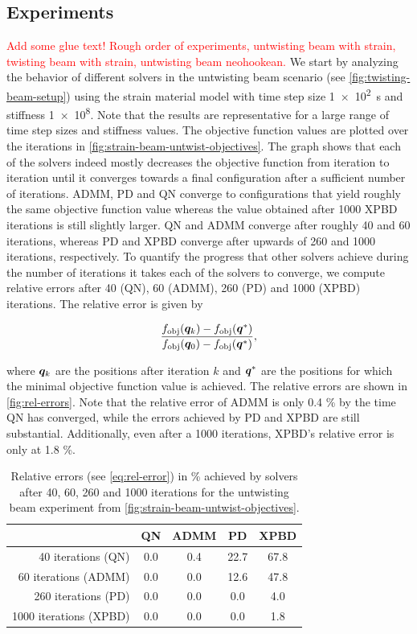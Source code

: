 \subsection{Experiments}\label{ss:experiments}
\textcolor{red}{Add some glue text! Rough order of experiments, untwisting beam with strain, twisting beam with strain, untwisting beam neohookean.}
We start by analyzing the behavior of different solvers in the untwisting beam scenario (see \cref{fig:twisting-beam-setup}) using the strain material model 
with time step size \SI{1e2}{\second} and stiffness \num{1e8}. Note that the results are representative for a large range of time step sizes and stiffness values.
The objective function values are plotted over the iterations in \autoref{fig:strain-beam-untwist-objectives}. The graph shows that each of the solvers indeed mostly 
decreases the objective function from iteration to iteration until it converges towards a final configuration after 
a sufficient number of iterations. ADMM, PD and QN converge to configurations that yield roughly the same objective function value whereas the value obtained after 1000 
XPBD iterations is still slightly larger. QN and ADMM converge after roughly 40 and 60 iterations, whereas PD and XPBD converge after upwards of 260 and 1000 iterations, 
respectively. To quantify the progress that other solvers achieve during the number of iterations it takes each of the solvers to converge, we compute relative errors after 
40 (QN), 60 (ADMM), 260 (PD) and 1000 (XPBD) iterations. The relative error is given by 

\begin{equation}\label{eq:rel-error}
    \frac{f_{\text{obj}}(\bm{q}_k) - f_{\text{obj}}(\bm{q}^*)}{f_{\text{obj}}(\bm{q}_0) - f_{\text{obj}}(\bm{q}^*)},
\end{equation}

\noindent where $\bm{q}_k$ are the positions after iteration $k$ and $\bm{q}^*$ are the positions for which the minimal objective function value is achieved.
The relative errors are shown in \autoref{fig:rel-errors}. Note that the relative error of ADMM is only 0.4 \% by the time QN has converged, while the errors 
achieved by PD and XPBD are still substantial. Additionally, even after a 1000 iterations, XPBD's relative error is only at 1.8 \%.

\begin{table}[h]
\centering
\begin{tabular}{ |r||c|c|c|c| } 
 \hline
 & QN & ADMM & PD & XPBD\\
 \hline
 \hline
    40 iterations (QN) & 0.0 & 0.4 & 22.7 & 67.8 \\ 
    60 iterations (ADMM) & 0.0 & 0.0 & 12.6 & 47.8 \\
    260 iterations (PD) & 0.0 & 0.0 & 0.0 & 4.0 \\
    1000 iterations (XPBD) & 0.0 & 0.0 & 0.0 & 1.8 \\ 
 \hline
\end{tabular}
\caption{Relative errors (see \cref{eq:rel-error}) in \% achieved by solvers after 40, 60, 260 and 1000 iterations for the untwisting beam experiment from 
\autoref{fig:strain-beam-untwist-objectives}.}
\label{fig:rel-errors}
\end{table}

